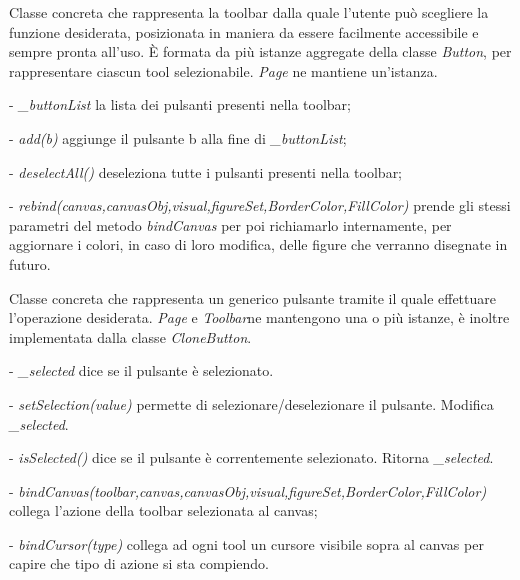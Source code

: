 Classe concreta che rappresenta la toolbar dalla quale l'utente pu\` o scegliere la funzione desiderata, posizionata in maniera da essere facilmente accessibile e sempre pronta all'uso.
\` E formata da pi\` u istanze aggregate della classe \textit{Button}, per rappresentare ciascun tool selezionabile. 
\textit{Page} ne mantiene un'istanza.
\begin{elencopuntato}[\subsubsecindent]
\item[-] \textit{{\_}buttonList} la lista dei pulsanti presenti nella toolbar;
\end{elencopuntato}
\begin{elencopuntato}[\subsubsecindent]
\item[-]  \textit{add(b)} aggiunge il pulsante b alla fine di \textit{{\_}buttonList};
\item[-] \textit{deselectAll()} deseleziona tutte i pulsanti presenti nella toolbar;
\item[-] \textit{rebind(canvas,canvasObj,visual,figureSet,BorderColor,FillColor)} prende gli stessi parametri del metodo \textit{bindCanvas} per poi richiamarlo internamente, per aggiornare i colori, in caso di loro modifica, delle figure che verranno disegnate in futuro.
\end{elencopuntato}

Classe concreta che rappresenta un generico pulsante tramite il quale effettuare l'operazione desiderata.
\textit{Page} e \textit{Toolbar}ne mantengono una o pi\` u istanze, \` e inoltre implementata dalla classe \textit{CloneButton}.
\begin{elencopuntato}[\subsubsecindent]
\item[-] \textit{{\_}selected} dice se il pulsante \`e selezionato.
\end{elencopuntato}
\begin{elencopuntato}[\subsubsecindent]
\item[-]  \textit{setSelection(value)} permette di selezionare/deselezionare il pulsante. Modifica \textit{{\_}selected}.
\item[-]  \textit{isSelected()} dice se il pulsante \`e correntemente selezionato. Ritorna \textit{{\_}selected}.
\item[-]  \textit{bindCanvas(toolbar,canvas,canvasObj,visual,figureSet,BorderColor,FillColor)} collega l'azione della toolbar selezionata al canvas;
\item[-]  \textit{bindCursor(type)} collega ad ogni tool un cursore visibile sopra al canvas per capire che tipo di azione si sta compiendo.
\end{elencopuntato}

